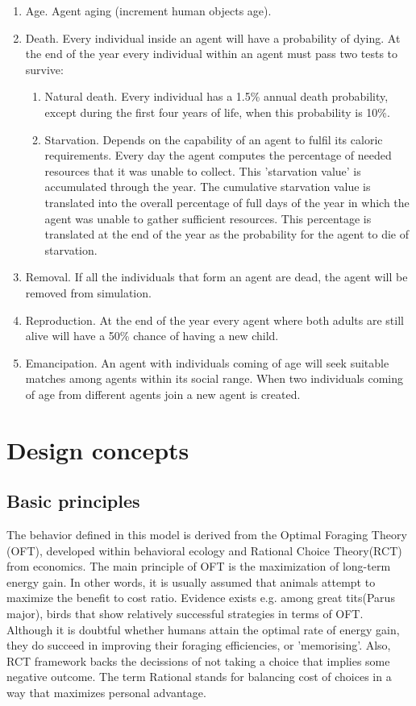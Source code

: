 \documentclass[11pt,oneside,a4paper,openright]{report}
\begin{document}
\begin{enumerate}[1-]
	\item Age. Agent aging (increment human objects age).
	\item Death. Every individual inside an agent will have a probability of dying. At the end of the year
	every individual within an agent must pass two tests to survive:
	\begin{enumerate}
		\item Natural death. Every individual has a 1.5\% annual death probability, except during the
		first four years of life, when this probability is 10\%.
		\item Starvation. Depends on the capability of an agent to fulfil its caloric requirements. Every
		day the agent computes the percentage of needed resources that it was unable to collect.
		This 'starvation value' is accumulated through the year. The cumulative starvation value is
		translated into the overall percentage of full days of the year in which the agent was
		unable to gather sufficient resources. This percentage is translated at the end of the year
		as the probability for the agent to die of starvation.
	\end{enumerate}
	\item Removal. If all the individuals that form an agent are dead, the agent will be removed from
	simulation.
	\item Reproduction. At the end of the year every agent where both adults are still alive will have a
	50\% chance of having a new child.
	\item Emancipation. An agent with individuals coming of age will seek suitable matches among
	agents within its social range. When two individuals coming of age from different agents join a
	new agent is created.
\end{enumerate}

\section{Design concepts}

\subsection{Basic principles}
The behavior defined in this model is derived from the Optimal Foraging Theory (OFT)\cite{Holling1973}, developed
within behavioral ecology and Rational Choice Theory(RCT)\cite{Scott2000} from economics. The main principle of OFT is the maximization of long-term energy gain. In other words, it is usually assumed that animals attempt to maximize the benefit to cost ratio. Evidence exists e.g. among great tits(Parus major), birds that show relatively successful strategies in terms of OFT. Although it is doubtful whether humans attain the optimal rate of energy gain, they do succeed in improving their foraging efficiencies, or 'memorising'. Also, RCT framework backs the decissions of not taking a choice that implies some negative outcome. The term Rational stands for balancing cost of choices in a way that maximizes personal advantage.
\end{document}
